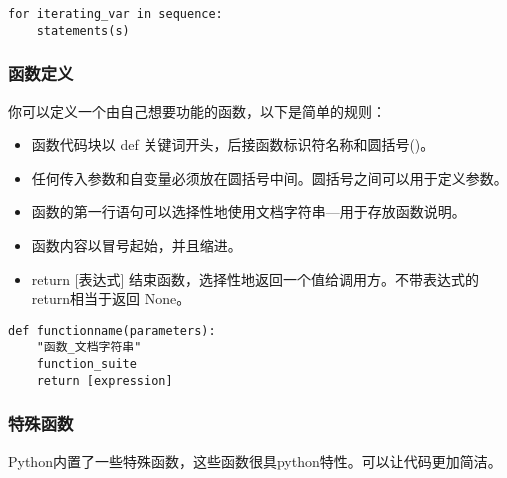 \documentclass[10pt,a4paper]{ctexbook}
\begin{document}
\begin{verbatim}
for iterating_var in sequence:
    statements(s)
\end{verbatim}

\subsubsection{函数定义}
你可以定义一个由自己想要功能的函数，以下是简单的规则：
\begin{itemize}
\item 函数代码块以 def 关键词开头，后接函数标识符名称和圆括号()。
\item 任何传入参数和自变量必须放在圆括号中间。圆括号之间可以用于定义参数。
\item 函数的第一行语句可以选择性地使用文档字符串—用于存放函数说明。
\item 函数内容以冒号起始，并且缩进。
\item return [表达式] 结束函数，选择性地返回一个值给调用方。不带表达式的return相当于返回 None。
\end{itemize}

\begin{verbatim}
def functionname(parameters):
    "函数_文档字符串"
    function_suite
    return [expression]
\end{verbatim}

\subsubsection{特殊函数}
Python内置了一些特殊函数，这些函数很具python特性。可以让代码更加简洁。
\end{document}
